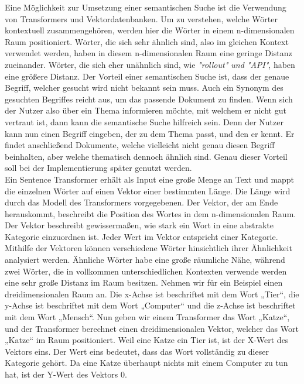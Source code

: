 Eine Möglichkeit zur Umsetzung einer semantischen Suche ist die Verwendung von Transformers und Vektordatenbanken.
Um zu verstehen, welche Wörter kontextuell zusammengehören, werden hier die Wörter in einem n-dimensionalen Raum positioniert.
Wörter, die sich sehr ähnlich sind, also im gleichen Kontext verwendet werden, haben in diesem n-dimensionalen Raum eine geringe Distanz zueinander.
Wörter, die sich eher unähnlich sind, wie \textit{"rollout" und "API"}, haben eine größere Distanz.
Der Vorteil einer semantischen Suche ist, dass der genaue Begriff, welcher gesucht wird nicht bekannt sein muss.
Auch ein Synonym des gesuchten Begriffes reicht aus, um das passende Dokument zu finden.
Wenn sich der Nutzer also über ein Thema informieren möchte, mit welchem er nicht gut vertraut ist, dann kann die semantische Suche hilfreich sein.
Denn der Nutzer kann nun einen Begriff eingeben, der zu dem Thema passt, und den er kennt.
Er findet anschließend Dokumente, welche vielleicht nicht genau diesen Begriff beinhalten, aber welche thematisch dennoch ähnlich sind.
Genau dieser Vorteil soll bei der Implementierung später genutzt werden.\\

Ein Sentence Transformer erhält als Input eine große Menge an Text und mappt die einzelnen Wörter auf einen Vektor einer bestimmten Länge.
Die Länge wird durch das Modell des Transformers vorgegebenen.
Der Vektor, der am Ende herauskommt, beschreibt die Position des Wortes in dem n-dimensionalen Raum.
Der Vektor beschreibt gewissermaßen, wie stark ein Wort in eine abstrakte Kategorie einzuordnen ist.
Jeder Wert im Vektor entspricht einer Kategorie.
Mithilfe der Vektoren können verschiedene Wörter hinsichtlich ihrer Ähnlichkeit analysiert werden.
Ähnliche Wörter habe eine große räumliche Nähe, während zwei Wörter, die in vollkommen unterschiedlichen Kontexten verwende werden eine sehr große Distanz im Raum besitzen.
Nehmen wir für ein Beispiel einen dreidimensionalen Raum an.
Die x-Achse ist beschriftet mit dem Wort „Tier“, die y-Achse ist beschriftet mit dem Wort „Computer“ und die z-Achse ist beschriftet mit dem Wort „Mensch“.
Nun geben wir einem Transformer das Wort „Katze“, und der Transformer berechnet einen dreidimensionalen Vektor, welcher das Wort „Katze“ im Raum positioniert.
Weil eine Katze ein Tier ist, ist der X-Wert des Vektors eins.
Der Wert eins bedeutet, dass das Wort vollständig zu dieser Kategorie gehört.
Da eine Katze überhaupt nichts mit einem Computer zu tun hat, ist der Y-Wert des Vektors 0.\\

